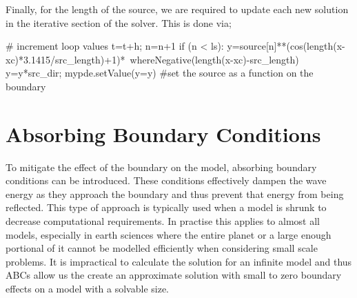 Finally, for the length of the source, we are required to update each new
solution in the iterative section of the solver. This is done via;
\begin{python}
# increment loop values
t=t+h; n=n+1
if (n < ls):
	y=source[n]**(cos(length(x-xc)*3.1415/src_length)+1)*\
                   whereNegative(length(x-xc)-src_length)
        y=y*src_dir; mypde.setValue(y=y) #set the source as a function on the
boundary
\end{python}

\section{Absorbing Boundary Conditions}
To mitigate the effect of the boundary on the model, absorbing boundary
conditions can be introduced. These conditions effectively dampen the wave energy
as they approach the boundary and thus prevent that energy from being reflected.
This type of approach is typically used when a model is shrunk to decrease
computational requirements. In practise this applies to almost all models,
especially in earth sciences where the entire planet or a large enough
portional of it cannot be modelled efficiently when considering small scale
problems. It is impractical to calculate the solution for an infinite model and thus ABCs allow
us the create an approximate solution with small to zero boundary effects on a
model with a solvable size.


